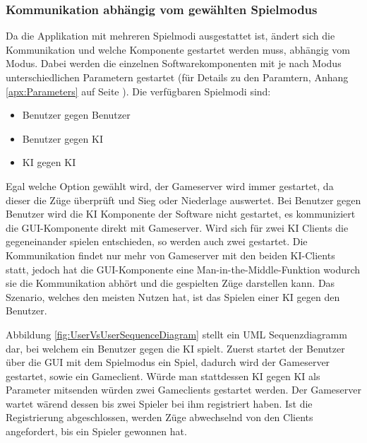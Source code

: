 \documentclass[12pt,a4paper,bibliography=totocnumbered,listof=totocnumbered]{article}
\begin{document}
\subsubsection{Kommunikation abhängig vom gewählten Spielmodus}
\label{chap:NetworkModie}
Da die Applikation mit mehreren Spielmodi ausgestattet ist, ändert sich die Kommunikation und welche Komponente gestartet werden muss, abhängig vom Modus.
Dabei werden die einzelnen Softwarekomponenten mit je nach Modus unterschiedlichen Parametern gestartet (für Details zu den Paramtern, Anhang \ref{apx:Parameters}
auf Seite \pageref{apx:Parameters}).
Die verfügbaren Spielmodi sind:
\begin{itemize}
    \item Benutzer gegen Benutzer
    \item Benutzer gegen KI
    \item KI gegen KI
\end{itemize}
Egal welche Option gewählt wird, der Gameserver wird immer gestartet, da dieser die Züge überprüft und Sieg oder Niederlage auswertet.
Bei Benutzer gegen Benutzer wird die KI Komponente der Software nicht gestartet, es kommuniziert die GUI-Komponente direkt mit Gameserver.
Wird sich für zwei KI Clients die gegeneinander spielen entschieden, so werden auch zwei gestartet.
Die Kommunikation findet nur mehr von Gameserver mit den beiden KI-Clients statt, jedoch hat die GUI-Komponente eine Man-in-the-Middle-Funktion
wodurch sie die Kommunikation abhört und die gespielten Züge darstellen kann.
Das Szenario, welches den meisten Nutzen hat, ist das Spielen einer KI gegen den Benutzer. 

Abbildung \ref{fig:UserVsUserSequenceDiagram} stellt ein UML Sequenzdiagramm dar, bei welchem ein Benutzer gegen die KI spielt.
Zuerst startet der Benutzer über die GUI mit dem Spielmodus ein Spiel, dadurch wird der Gameserver gestartet, sowie ein
Gameclient. Würde man stattdessen KI gegen KI als Parameter mitsenden würden zwei Gameclients gestartet werden. 
Der Gameserver wartet wärend dessen bis zwei Spieler bei ihm registriert haben. Ist die Registrierung abgeschlossen, werden Züge
abwechselnd von den Clients angefordert, bis ein Spieler gewonnen hat.
\end{document}
